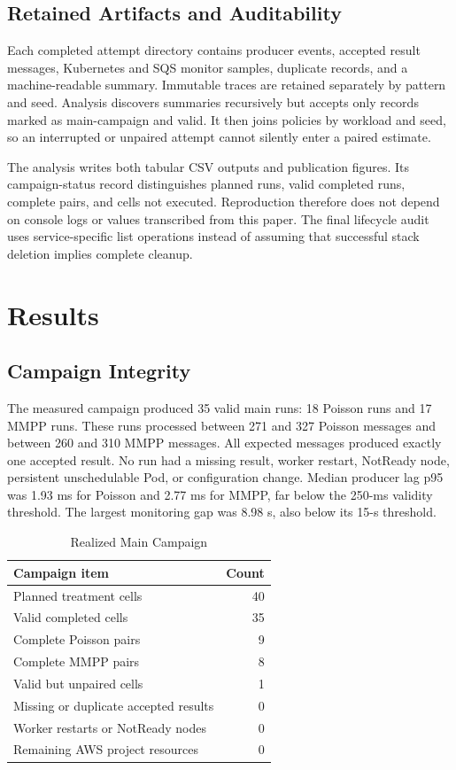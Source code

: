 \documentclass[conference]{IEEEtran}
\begin{document}
\subsection{Retained Artifacts and Auditability}

Each completed attempt directory contains producer events, accepted result
messages, Kubernetes and SQS monitor samples, duplicate records, and a
machine-readable summary. Immutable traces are retained separately by pattern
and seed. Analysis discovers summaries recursively but accepts only records
marked as main-campaign and valid. It then joins policies by workload and seed,
so an interrupted or unpaired attempt cannot silently enter a paired estimate.

The analysis writes both tabular CSV outputs and publication figures. Its
campaign-status record distinguishes planned runs, valid completed runs,
complete pairs, and cells not executed. Reproduction therefore does not depend
on console logs or values transcribed from this paper. The final lifecycle audit
uses service-specific list operations instead of assuming that successful stack
deletion implies complete cleanup.

\section{Results}

\subsection{Campaign Integrity}

The measured campaign produced 35 valid main runs: 18 Poisson runs and 17 MMPP
runs. These runs processed between 271 and 327 Poisson messages and between 260
and 310 MMPP messages. All expected messages produced exactly one accepted
result. No run had a missing result, worker restart, NotReady node, persistent
unschedulable Pod, or configuration change. Median producer lag p95 was 1.93 ms
for Poisson and 2.77 ms for MMPP, far below the 250-ms validity threshold. The
largest monitoring gap was 8.98 s, also below its 15-s threshold.

\begin{table}[t]
  \caption{Realized Main Campaign}
  \label{tab:campaign}
  \centering
  \begin{tabular}{lr}
    \toprule
    Campaign item & Count \\
    \midrule
    Planned treatment cells & 40 \\
    Valid completed cells & 35 \\
    Complete Poisson pairs & 9 \\
    Complete MMPP pairs & 8 \\
    Valid but unpaired cells & 1 \\
    Missing or duplicate accepted results & 0 \\
    Worker restarts or NotReady nodes & 0 \\
    Remaining AWS project resources & 0 \\
    \bottomrule
  \end{tabular}
\end{table}
\end{document}
